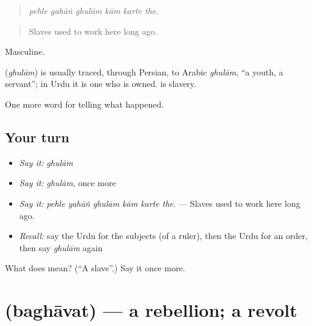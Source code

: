\begin{quote}
     
\end{quote}

\begin{quote}
\emph{pehle yahāṅ ghulām kām karte the.}
\end{quote}

\begin{quote}
Slaves used to work here long ago.
\end{quote}

Masculine.

\begin{cousinweb}
\textbf{} (\emph{ghulām}) is usually traced, through Persian, to Arabic \emph{ghulām}, \textquotedblleft{}a youth, a servant\textquotedblright{}; in Urdu it is one who is owned. \textbf{} is slavery.
\end{cousinweb}

\begin{grammarlens}[title={What you've built}]
One more word for telling what happened.
\end{grammarlens}

\subsection*{Your turn}
\begin{itemize}
\raggedright
  \item \emph{Say it:} \emph{ghulām}
  \item \emph{Say it:} \emph{ghulām}, once more
  \item \emph{Say it:} \emph{pehle yahāṅ ghulām kām karte the.} — Slaves used to work here long ago.
  \item \emph{Recall:} say the Urdu for the subjects (of a ruler), then the Urdu for an order, then say \emph{ghulām} again
\end{itemize}

\begin{tcolorbox}[breakable,colback=teal!4,colframe=teal!35!black,title={Before you move on}]
What does  mean? (\textquotedblleft{}A slave\textquotedblright{}.) Say it once more.
\end{tcolorbox}
\section[\texorpdfstring{\ur{بغاوت} (baghāvat)}{بغاوت (baghāvat)}]{ (baghāvat) — a rebellion; a revolt}

